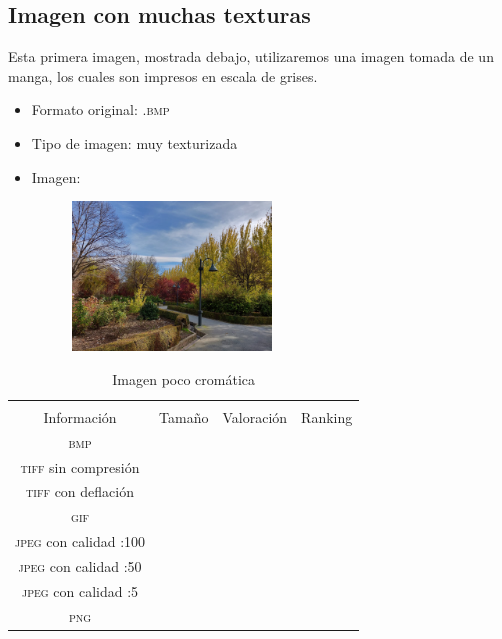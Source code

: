 \documentclass[11pt,a4paper]{article}
\begin{document}
\subsection{Imagen con muchas texturas}

Esta primera imagen, mostrada debajo, utilizaremos una imagen tomada de un manga, los cuales son impresos en escala de grises.

\begin{itemize}
	\item Formato original: \textsc{.bmp}
	\item Tipo de imagen: muy texturizada
	\item Imagen:
		\begin{figure}[H]
		\centering
			\includegraphics[width=0.5\textwidth]{Fotos/texturas.jpg}
		\end{figure}	
\end{itemize}

\begin{table}[H]
\centering
\begin{tabular}{|c|c|c|c|}
\hline
\diagbox[width=15em]{\textit{Códec}/Formato}{\\Información} & Tamaño & Valoración & Ranking \\
\hline
\textsc{bmp} &  &  &  \\ \hline
\textsc{tiff} sin compresión &  &  &  \\ \hline
\textsc{tiff} con deflación &  &  &  \\ \hline
\textsc{gif} &  &  &  \\ \hline
\textsc{jpeg} con calidad :100 &  &  &  \\ \hline
\textsc{jpeg} con calidad :50 &  &  &  \\ \hline
\textsc{jpeg} con calidad :5 &  &  &  \\ \hline
\textsc{png} &  &  &  \\ \hline
\end{tabular}
\caption{Imagen poco cromática}
\label{tab:my-table}
\end{table}
\end{document}
